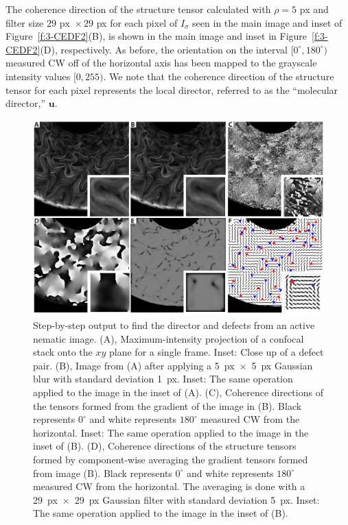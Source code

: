 The coherence direction of the structure tensor calculated with $\rho = 5$ px and filter size $29\textrm{ px } \times 29$ px for each pixel of $I_{\sigma}$ seen in the main image and inset of Figure~\ref{f:3-CEDF2}(B), is shown in the main image and inset in Figure~\ref{f:3-CEDF2}(D), respectively.
As before, the orientation on the interval $[0^{\circ}, 180^{\circ})$ measured CW off of the horizontal axis has been mapped to the grayscale intensity values $[0,255)$.
 We note that the coherence direction of the structure tensor for each pixel represents the local director, referred to as the ``molecular director,'' $\mathbf{u}$.
\newpage
\begin{figure}[H]
  \centering
  \includegraphics{figures/C3/Ch3-Figs_CEDF2.png}
  \caption{Step-by-step output to find the director and defects from an active nematic image.
(A), Maximum-intensity projection of a confocal stack onto the $xy$ plane for a single frame.
Inset: Close up of a defect pair.
(B), Image from (A) after applying a 5~px~$\times$~5~px Gaussian blur with standard deviation 1~px.
Inset: The same operation applied to the image in the inset of (A).
(C), Coherence directions of the tensors formed from the gradient of the image in (B).
Black represents $0^{\circ}$ and white represents $180^{\circ}$ measured CW from the horizontal.
Inset: The same operation applied to the image in the inset of (B).
(D), Coherence directions of the structure tensors formed by component-wise averaging the gradient tensors formed from image (B).
Black represents $0^{\circ}$ and white represents $180^{\circ}$ measured CW from the horizontal.
The averaging is done with a 29~px~$\times$~29~px Gaussian filter with standard deviation 5~px.
Inset: The same operation applied to the image in the inset of (B).
}
\end{figure}
